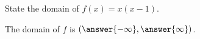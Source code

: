 \documentclass{ximera}
\author{Carl Stitz \and Jeff Zeager \and Bart Snapp \and Matthew Carr}
\begin{document}
\begin{exercise}



State the domain of $f(x)=x(x-1)$.
\begin{center}
The domain of $f$ is $(\answer{-\infty},\answer{\infty})$.
\end{center}

\end{exercise}
\end{document}
